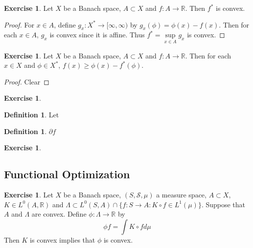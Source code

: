 \documentclass[12pt]{amsart}
\theoremstyle{definition}
\newtheorem{defn}[definition]{Definition}
\newtheorem{ex}[definition]{Exercise}
\newcommand{\Lam}{\Lambda}
\newcommand{\R}{\mathbb{R}}
\newcommand{\MS}{\mathcal{S}}
\newcommand{\Rd}{[\infty, \infty)}
\newcommand{\lex}[1]{\label{ex:#1}}
\newcommand{\ld}[1]{\label{defn:#1}}
\begin{document}
	\begin{ex} \lex{}
	Let $X$ be a Banach space, $A \subset X$ and $f:A \rightarrow \R$. Then $f^*$ is convex. 
	\end{ex}
	
	\begin{proof}
		For $x \in A$, define $g_x: X^* \rightarrow \Rd$ by $g_x(\phi) = \phi(x) - f(x)$. Then for each $x \in A$, $g_x$ is convex since it is affine. Thus $f^* = \sup\limits_{x \in A} g_x$		 
is convex.  
	\end{proof}
	
	\begin{ex} \lex{}
		Let $X$ be a Banach space, $A \subset X$ and $f:A \rightarrow \R$. Then for each $x \in X$ and $\phi \in X^*$, $f(x) \geq \phi(x) - f^*(\phi)$.	
	\end{ex}
	
	\begin{proof}
	Clear
	\end{proof}
	
	\begin{ex} \lex{}
	
	\end{ex}
	
	\newpage
	
	
	
	
	
	
	
	
	
	
	\begin{defn} \ld{}
	Let 
	\end{defn}
	
	\begin{defn} \ld{}
	$\partial f$
	\end{defn}	
	
	\begin{ex} \lex{}
	
	\end{ex}
	
	
	\subsection{Functional Optimization}
	\begin{ex} \lex{}
	Let $X$ be a Banach space, $(S, \MS, \mu)$ a measure space, $A \subset X$, $K \in L^0(A, \R)$ and $\Lam \subset L^0(S, A) \cap \{f:S \rightarrow A:  K \circ f \in L^1(\mu) \}$. Suppose that $A$ and $\Lam$ are convex. Define $\phi: \Lam \rightarrow \R$ by $$\phi f = \int K\circ f d \mu $$
	Then $K$ is convex implies that $\phi$ is convex. 
	\end{ex}	
	
\end{document}
